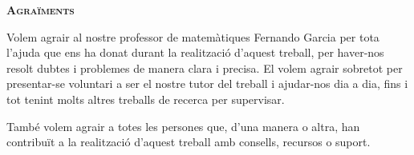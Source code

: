 \clearpage
\begin{modernquote}
\textsc{\textbf{Agraïments}}\par
{}
\raggedright
Volem agrair al nostre professor de matemàtiques Fernando Garcia per tota l'ajuda que ens ha donat durant la realització d'aquest treball, per haver-nos resolt dubtes i problemes de manera clara i precisa. El volem agrair sobretot per presentar-se voluntari a ser el nostre tutor del treball i ajudar-nos dia a dia, fins i tot tenint molts altres treballs de recerca per supervisar.\par

També volem agrair a totes les persones que, d'una manera o altra, han contribuït a la realització d'aquest treball amb consells, recursos o suport.
\end{modernquote}
